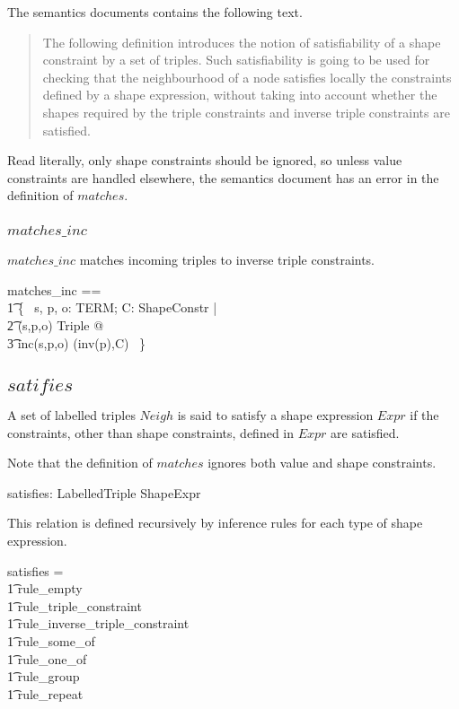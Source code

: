 \documentclass{article}
\begin{document}
The semantics documents contains the following text.
\begin{quote}
The following definition introduces the notion of satisfiability of a shape constraint by a set of triples. Such satisfiability is going to be used for checking that the neighbourhood of a node satisfies locally the constraints defined by a shape expression, without taking into account whether the shapes required by the triple constraints and inverse triple constraints are satisfied.
\end{quote}

Read literally, only shape constraints should be ignored, so unless value constraints are handled elsewhere, 
the semantics document has an error in the definition of $matches$.

\subsubsection{$matches\_inc$}
$matches\_inc$ matches incoming triples to inverse triple constraints.
\begin{zed}
	matches\_inc == \\
\t1		\{~ s, p, o: TERM; C: ShapeConstr | \\
\t2			(s,p,o) \in Triple @ \\
\t3				inc(s,p,o) \mapsto (inv(p),C) ~\} 
\end{zed}

\subsection{$satifies$}
A set of labelled triples $Neigh$ is said to satisfy a shape expression $Expr$ if the constraints, other than shape constraints,
defined in $Expr$ are satisfied.

Note that the definition of $matches$ ignores both value and shape constraints.

\begin{axdef}
	satisfies: \finset LabelledTriple \rel ShapeExpr
\end{axdef}

This relation is defined recursively by inference rules for each type of shape expression.
\begin{zed}
	satisfies = \\
\t1		rule\_empty \cup \\
\t1		rule\_triple\_constraint \cup \\
\t1		rule\_inverse\_triple\_constraint \cup \\
\t1		rule\_some\_of \cup \\
\t1		rule\_one\_of \cup \\
\t1		rule\_group \cup \\
\t1		rule\_repeat
\end{zed}
\end{document}
